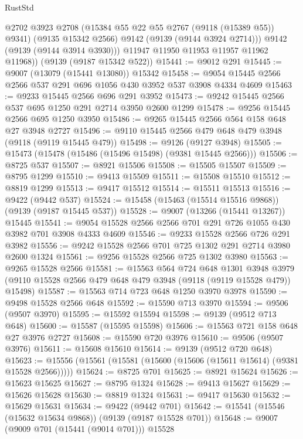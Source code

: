 \begin{lexlean}{RustStd}
\begin{coremodule}
            @2702
            @3923
            @2708
            (@15384 @55 @22 @55 @2767 (@9118 (@15389 @55)) @9341)
            (@9135 @15342 @2566)
            @9142
            (@9139 (@9144 @3924 @2714)))
          @9142
          (@9139 (@9144 @3914 @3930)))
        @11947
        @11950
        @11953
        @11957
        @11962
        @11968))
    (@9139 (@9187 @15342 @522))
@15441 := @9012 @291
@15445 := @9007 (@13079 (@15441 @13080)) @15342
@15458 := @9054 @15445 @2566 @2566 @537 @291 @696 @1056 @430 @3952 @537 @3908 @4334 @4609
@15463 := @9233 @15445 @2566 @696 @291 @3952
@15473 := @9242 @15445 @2566 @537 @695 @1250 @291 @2714 @3950 @2600 @1299
@15478 := @9256 @15445 @2566 @695 @1250 @3950
@15486 := @9265 @15445 @2566 @564 @158 @648 @27 @3948 @2727
@15496 := @9110 @15445 @2566 @479 @648 @479 @3948 (@9118 (@9119 @15445 @479))
@15498 := @9126 (@9127 @3948)
@15505 := @15473 (@15478 (@15486 (@15496 @15498) (@9381 @15445 @2566)))
@15506 := @8725 @537
@15507 := @8921 @15506
@15508 := @15505 @15507
@15509 := @8795 @1299
@15510 := @9413 @15509
@15511 := @15508 @15510
@15512 := @8819 @1299
@15513 := @9417 @15512
@15514 := @15511 @15513
@15516 := @9422 (@9442 @537)
@15524 := @15458 (@15463 (@15514 @15516 @9868)) (@9139 (@9187 @15445 @537))
@15528 := @9007 (@13266 (@15441 @13267)) @15445
@15541 := @9054 @15528 @2566 @2566 @701 @291 @726 @1055 @430 @3982 @701 @3908 @4333 @4609
@15546 := @9233 @15528 @2566 @726 @291 @3982
@15556 := @9242 @15528 @2566 @701 @725 @1302 @291 @2714 @3980 @2600 @1324
@15561 := @9256 @15528 @2566 @725 @1302 @3980
@15563 := @9265 @15528 @2566
@15581 := @15563
    @564
    @724
    @648
    @1301
    @3948
    @3979
    (@9110 @15528 @2566 @479 @648 @479 @3948 (@9118 (@9119 @15528 @479)) @15498)
@15587 := @15563 @714 @723 @648 @1250 @3970 @3978
@15590 := @9498 @15528 @2566 @648
@15592 := @15590 @713 @3970
@15594 := @9506 (@9507 @3970)
@15595 := @15592 @15594
@15598 := @9139 (@9512 @713 @648)
@15600 := @15587 (@15595 @15598)
@15606 := @15563 @721 @158 @648 @27 @3976 @2727
@15608 := @15590 @720 @3976
@15610 := @9506 (@9507 @3976)
@15611 := @15608 @15610
@15614 := @9139 (@9512 @720 @648)
@15623 := @15556 (@15561 (@15581 (@15600 (@15606 (@15611 @15614) (@9381 @15528 @2566)))))
@15624 := @8725 @701
@15625 := @8921 @15624
@15626 := @15623 @15625
@15627 := @8795 @1324
@15628 := @9413 @15627
@15629 := @15626 @15628
@15630 := @8819 @1324
@15631 := @9417 @15630
@15632 := @15629 @15631
@15634 := @9422 (@9442 @701)
@15642 := @15541 (@15546 (@15632 @15634 @9868)) (@9139 (@9187 @15528 @701))
@15648 := @9007 (@9009 @701 (@15441 (@9014 @701))) @15528

\end{coremodule}
\end{lexlean}
